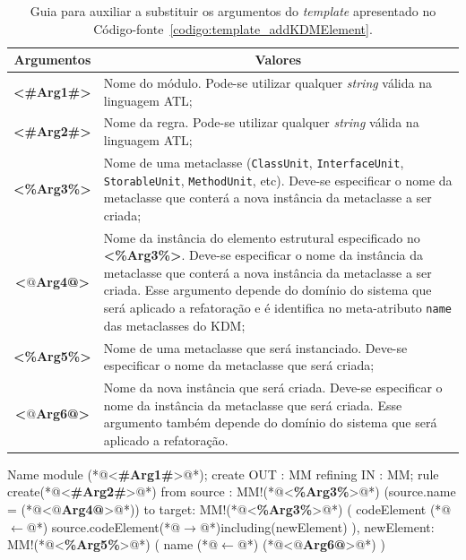 \begin{table}
\centering
\caption{Guia para auxiliar a substituir os argumentos do \textit{template} apresentado no Código-fonte~\ref{codigo:template_addKDMElement}.}
\label{tab:guia_template_operacao_add}
\begin{tabular}{ | m{1.7cm} | m{12cm}| } 
\hline
\multicolumn{1}{|c|}{Argumentos}                                         & \multicolumn{1}{c|}{Valores} \\ \hline
\multicolumn{1}{|c|}{\textbf{<\#Arg1\#>}} & Nome do módulo. Pode-se utilizar qualquer \textit{string} válida na linguagem ATL; \\ 
\hline
\multicolumn{1}{|c|}{\textbf{<\#Arg2\#>}} & Nome da regra. Pode-se utilizar qualquer \textit{string} válida na linguagem ATL; \\  
\hline
\multicolumn{1}{|c|}{\textbf{<\%Arg3\%>}} & Nome de uma metaclasse (\texttt{ClassUnit}, \texttt{InterfaceUnit}, \texttt{StorableUnit}, \texttt{MethodUnit}, etc). Deve-se especificar o nome da metaclasse que conterá a nova instância da metaclasse a ser criada; \\ 
\hline
\multicolumn{1}{|c|}{\textbf{<$@$Arg4@>}} & Nome da instância do elemento estrutural especificado no \textbf{<\%Arg3\%>}. Deve-se especificar o nome da instância da metaclasse que conterá a nova instância da metaclasse a ser criada. Esse argumento depende do domínio do sistema que será aplicado a refatoração e é identifica no meta-atributo \texttt{name} das metaclasses do KDM;  \\ 
\hline
\multicolumn{1}{|c|}{\textbf{<\%Arg5\%>}} & Nome de uma metaclasse que será instanciado. Deve-se especificar o nome da metaclasse que será criada;  \\ 
\hline
\multicolumn{1}{|c|}{\textbf{<$@$Arg6@>}} & Nome da nova instância que será criada. Deve-se especificar o nome da instância da metaclasse que será criada. Esse argumento também depende do domínio do sistema que será aplicado a refatoração.  \\ 
\hline
\end{tabular}
\end{table}


\begin{codigo}[caption={[\textit{Template} ATL para realizar a operação atômica \texttt{add}.] \textit{Template} ATL para realizar a operação atômica \texttt{add}.},escapeinside={(*@}{@*)}, basicstyle=\footnotesize, label={codigo:template_addKDMElement}, language=ATL]{Name}
module (*@<\textbf{\#Arg1\#}>@*);
create OUT : MM refining IN : MM;
rule create(*@<\textbf{\#Arg2\#}>@*){
	from
		source : MM!(*@<\textbf{\%Arg3\%}>@*) (source.name = (*@<\textbf{$@$Arg4@}>@*))
	to 
		target: MM!(*@<\textbf{\%Arg3\%}>@*) (
			codeElement (*@$\leftarrow$@*) source.codeElement(*@$\rightarrow$@*)including(newElement)
		),
		newElement: MM!(*@<\textbf{\%Arg5\%}>@*) (
			name (*@$\leftarrow$@*) (*@<\textbf{$@$Arg6@}>@*)
		)
}
\end{codigo}


